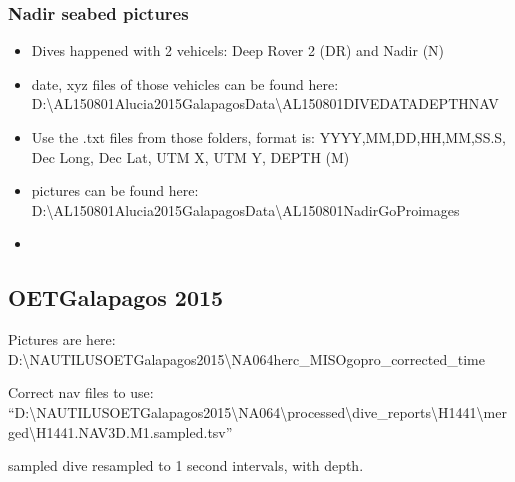 \documentclass[letterpaper,10pt,english]{sphinxmanual}
\begin{document}
\subsubsection{Nadir seabed pictures}
\label{\detokenize{02_folder_hierarchy:nadir-seabed-pictures}}\begin{itemize}
\item {} 
\sphinxAtStartPar
Dives happened with 2 vehicels: Deep Rover 2 (DR)  and Nadir (N)

\item {} 
\sphinxAtStartPar
date, xyz files of those vehicles can be found here: D:\textbackslash{}AL150801\sphinxhyphen{}Alucia\sphinxhyphen{}2015\sphinxhyphen{}Galapagos\sphinxhyphen{}Data\textbackslash{}AL150801\sphinxhyphen{}DIVE\sphinxhyphen{}DATA\sphinxhyphen{}DEPTH\sphinxhyphen{}NAV

\item {} 
\sphinxAtStartPar
Use the .txt files from those folders, format is: YYYY,MM,DD,HH,MM,SS.S, Dec Long,  Dec Lat,  UTM X,  UTM Y,  \sphinxhyphen{}DEPTH (M)

\item {} 
\sphinxAtStartPar
pictures can be found here: D:\textbackslash{}AL150801\sphinxhyphen{}Alucia\sphinxhyphen{}2015\sphinxhyphen{}Galapagos\sphinxhyphen{}Data\textbackslash{}AL150801\sphinxhyphen{}Nadir\sphinxhyphen{}GoPro\sphinxhyphen{}images

\item {} 
\end{itemize}


\subsection{OET\sphinxhyphen{}Galapagos 2015}
\label{\detokenize{02_folder_hierarchy:oet-galapagos-2015}}
\sphinxAtStartPar
Pictures are here: D:\textbackslash{}NAUTILUS\sphinxhyphen{}OET\sphinxhyphen{}Galapagos\sphinxhyphen{}2015\textbackslash{}NA064\sphinxhyphen{}herc\_MISO\sphinxhyphen{}gopro\_corrected\_time

\sphinxAtStartPar
Correct nav files to use: “D:\textbackslash{}NAUTILUS\sphinxhyphen{}OET\sphinxhyphen{}Galapagos\sphinxhyphen{}2015\textbackslash{}NA064\textbackslash{}processed\textbackslash{}dive\_reports\textbackslash{}H1441\textbackslash{}merged\textbackslash{}H1441.NAV3D.M1.sampled.tsv”

\sphinxAtStartPar
sampled  dive resampled to 1 second intervals, with depth.
\end{document}
